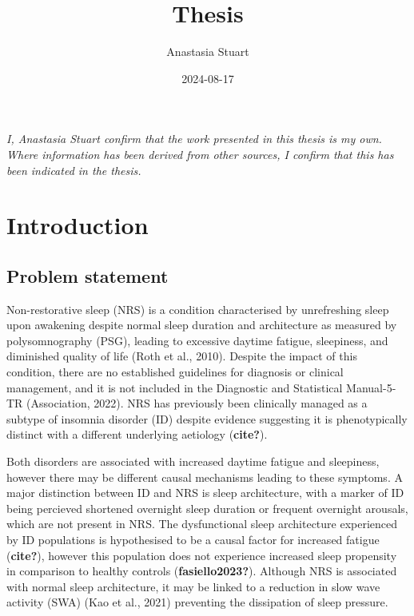 \documentclass[
]{article}
\title{Thesis}
\author{Anastasia Stuart}
\date{2024-08-17}
\begin{document}
\maketitle

\vspace*{\fill}

\noindent \textit{
I, Anastasia Stuart confirm that the work presented in this thesis is my own. Where information has been derived from other sources, I confirm that this has been indicated in the thesis.
} \vspace*{\fill}  \newpage


\tableofcontents

\newpage

\setcounter{page}{1}
\doublespacing
\setlength{\parindent}{0.5in}

\section{Introduction}\label{introduction}

\subsection{Problem statement}\label{problem-statement}

Non-restorative sleep (NRS) is a condition characterised by unrefreshing
sleep upon awakening despite normal sleep duration and architecture as
measured by polysomnography (PSG), leading to excessive daytime fatigue,
sleepiness, and diminished quality of life (Roth et al., 2010). Despite
the impact of this condition, there are no established guidelines for
diagnosis or clinical management, and it is not included in the
Diagnostic and Statistical Manual-5-TR (Association, 2022). NRS has
previously been clinically managed as a subtype of insomnia disorder
(ID) despite evidence suggesting it is phenotypically distinct with a
different underlying aetiology (\textbf{cite?}).

Both disorders are associated with increased daytime fatigue and
sleepiness, however there may be different causal mechanisms leading to
these symptoms. A major distinction between ID and NRS is sleep
architecture, with a marker of ID being percieved shortened overnight
sleep duration or frequent overnight arousals, which are not present in
NRS. The dysfunctional sleep architecture experienced by ID populations
is hypothesised to be a causal factor for increased fatigue
(\textbf{cite?}), however this population does not experience increased
sleep propensity in comparison to healthy controls
(\textbf{fasiello2023?}). Although NRS is associated with normal sleep
architecture, it may be linked to a reduction in slow wave activity
(SWA) (Kao et al., 2021) preventing the dissipation of sleep pressure.
\end{document}
